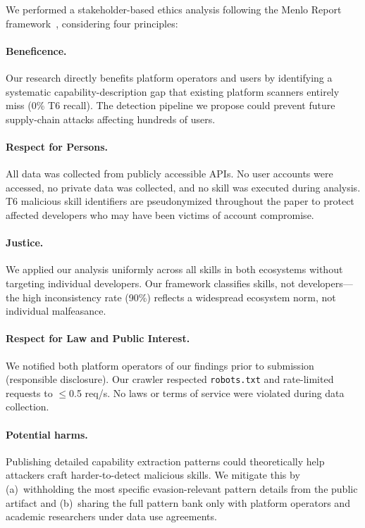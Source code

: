 
We performed a stakeholder-based ethics analysis following the Menlo Report framework~\cite{dittrich2012menlo}, considering four principles:

\paragraph{Beneficence.}
Our research directly benefits platform operators and users by identifying a systematic capability-description gap that existing platform scanners entirely miss (0\% T6 recall).
The detection pipeline we propose could prevent future supply-chain attacks affecting hundreds of users.

\paragraph{Respect for Persons.}
All data was collected from publicly accessible APIs.
No user accounts were accessed, no private data was collected, and no skill was executed during analysis.
T6 malicious skill identifiers are pseudonymized throughout the paper to protect affected developers who may have been victims of account compromise.

\paragraph{Justice.}
We applied our analysis uniformly across all skills in both ecosystems without targeting individual developers.
Our framework classifies skills, not developers---the high inconsistency rate (90\%)
reflects a widespread ecosystem norm, not individual malfeasance.

\paragraph{Respect for Law and Public Interest.}
We notified both platform operators of our findings prior to submission (responsible disclosure).
Our crawler respected \texttt{robots.txt} and rate-limited requests to $\leq$0.5 req/s.
No laws or terms of service were violated during data collection.

\paragraph{Potential harms.}
Publishing detailed capability extraction patterns could theoretically help attackers craft harder-to-detect malicious skills.
We mitigate this by (a)~withholding the most specific evasion-relevant pattern details from the public artifact and (b)~sharing the full pattern bank only with platform operators and academic researchers under data use agreements.
